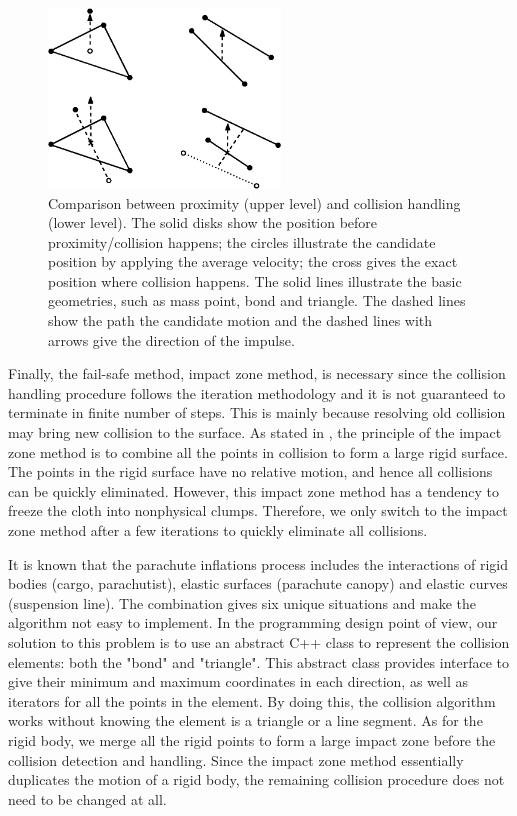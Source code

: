 \begin{figure}[!htbp]\centering
\includegraphics[width=0.55\textwidth]{Figures/collision_tri_bond}
\caption{Comparison between proximity (upper level) and collision handling (lower level). 
The solid disks show the position before proximity/collision happens; the circles illustrate the candidate position by applying the average velocity; the cross gives the exact position where collision happens. The solid lines illustrate the basic geometries, such as mass point, bond and triangle. The dashed lines show the path the candidate motion and the dashed lines with arrows give the direction of the impulse.}\label{fig:collision_proximity}
\end{figure}

Finally, the fail-safe method, impact zone method, is necessary since the collision handling procedure follows the iteration methodology and it is not guaranteed to terminate in finite number of steps. This is mainly because resolving old collision may bring new collision to the surface. As stated in \cite{Provot1997}, the principle of the impact zone method is to combine all the points in collision to form a large rigid surface. The points in the rigid surface have no relative motion, and hence all collisions can be quickly eliminated. However, this impact zone method has a tendency to freeze the cloth into nonphysical clumps. Therefore, we only switch to the impact zone method after a few iterations to quickly eliminate all collisions.

It is known that the parachute inflations process includes the interactions of rigid bodies (cargo, parachutist), elastic surfaces (parachute canopy) and elastic curves (suspension line). The combination gives six unique situations and make the algorithm not easy to implement. In the programming design point of view, our solution to this problem is to use an abstract C++ class to represent the collision elements: both the "bond" and "triangle". This abstract class provides interface to give their minimum and maximum coordinates in each direction, as well as iterators for all the points in the element. By doing this, the collision algorithm works without knowing the element is a triangle or a line segment. As for the rigid body, we merge all the rigid points to form a large impact zone before the collision detection and handling. Since the impact zone method essentially duplicates the motion of a rigid body, the remaining collision procedure does not need to be changed at all. 

